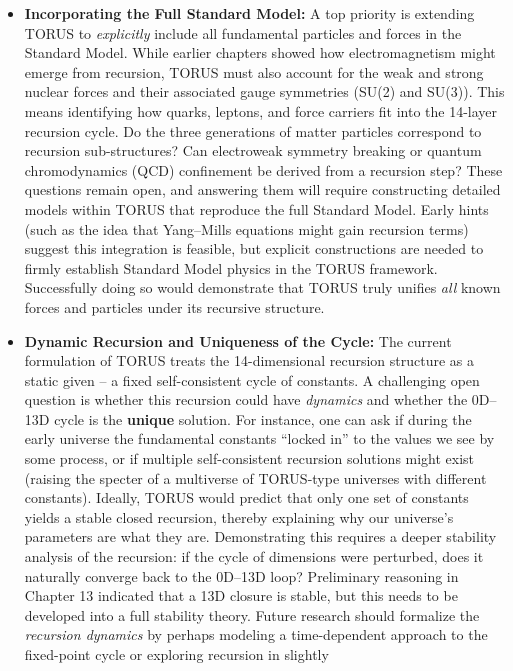 \documentclass[]{article}
\begin{document}
\begin{itemize}
\item
  \textbf{Incorporating the Full Standard Model:} A top priority is
  extending TORUS to \emph{explicitly} include all fundamental particles
  and forces in the Standard Model. While earlier chapters showed how
  electromagnetism might emerge from recursion, TORUS must also account
  for the weak and strong nuclear forces and their associated gauge
  symmetries (SU(2) and SU(3))​. This means identifying how quarks,
  leptons, and force carriers fit into the 14-layer recursion cycle. Do
  the three generations of matter particles correspond to recursion
  sub-structures? Can electroweak symmetry breaking or quantum
  chromodynamics (QCD) confinement be derived from a recursion step?
  These questions remain open, and answering them will require
  constructing detailed models within TORUS that reproduce the full
  Standard Model. Early hints (such as the idea that Yang--Mills
  equations might gain recursion terms) suggest this integration is
  feasible, but explicit constructions are needed to firmly establish
  Standard Model physics in the TORUS framework​. Successfully doing so
  would demonstrate that TORUS truly unifies \emph{all} known forces and
  particles under its recursive structure.
\item
  \textbf{Dynamic Recursion and Uniqueness of the Cycle:} The current
  formulation of TORUS treats the 14-dimensional recursion structure as
  a static given -- a fixed self-consistent cycle of constants. A
  challenging open question is whether this recursion could have
  \emph{dynamics} and whether the 0D--13D cycle is the \textbf{unique}
  solution. For instance, one can ask if during the early universe the
  fundamental constants ``locked in'' to the values we see by some
  process, or if multiple self-consistent recursion solutions might
  exist (raising the specter of a multiverse of TORUS-type universes
  with different constants)​. Ideally, TORUS would predict that only one
  set of constants yields a stable closed recursion, thereby explaining
  why our universe's parameters are what they are. Demonstrating this
  requires a deeper stability analysis of the recursion: if the cycle of
  dimensions were perturbed, does it naturally converge back to the
  0D--13D loop? Preliminary reasoning in Chapter 13 indicated that a 13D
  closure is stable, but this needs to be developed into a full
  stability theory​. Future research should formalize the
  \emph{recursion dynamics} by perhaps modeling a time-dependent
  approach to the fixed-point cycle or exploring recursion in slightly

\end{itemize}
\end{document}
